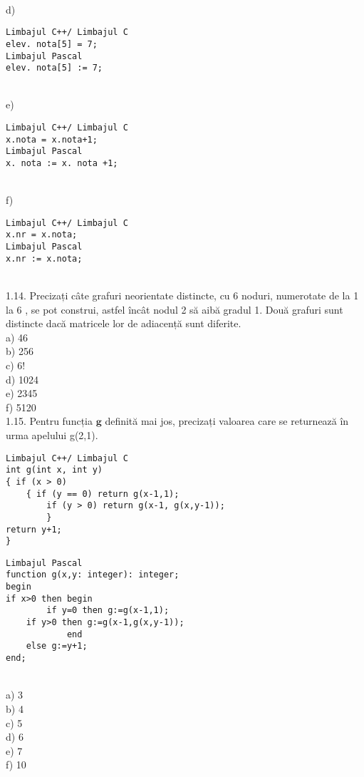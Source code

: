 \\
d) \begin{verbatim}
Limbajul C++/ Limbajul C
elev. nota[5] = 7;
Limbajul Pascal
elev. nota[5] := 7;
\end{verbatim}
\\
e) \begin{verbatim}
Limbajul C++/ Limbajul C
x.nota = x.nota+1;
Limbajul Pascal
x. nota := x. nota +1;
\end{verbatim}
\\
f) \begin{verbatim}
Limbajul C++/ Limbajul C
x.nr = x.nota;
Limbajul Pascal
x.nr := x.nota;
\end{verbatim}
\\
1.14. Precizați câte grafuri neorientate distincte, cu 6 noduri, numerotate de la 1 la 6 , se pot construi, astfel încât nodul 2 să aibă gradul 1. Două grafuri sunt distincte dacă matricele lor de adiacență sunt diferite.
\\
a) 46
\\
b) 256
\\
c) $6!$
\\
d) 1024
\\
e) 2345
\\
f) 5120
\\
1.15. Pentru funcția $\mathbf{g}$ definită mai jos, precizați valoarea care se returnează în urma apelului g(2,1).
\begin{verbatim}
Limbajul C++/ Limbajul C
int g(int x, int y)
{ if (x > 0)
    { if (y == 0) return g(x-1,1);
        if (y > 0) return g(x-1, g(x,y-1));
        }
return y+1;
}
\end{verbatim}
\begin{verbatim}
Limbajul Pascal
function g(x,y: integer): integer;
begin
if x>0 then begin
        if y=0 then g:=g(x-1,1);
    if y>0 then g:=g(x-1,g(x,y-1));
            end
    else g:=y+1;
end;
\end{verbatim}
\\
a) 3
\\
b) 4
\\
c) 5
\\
d) 6
\\
e) 7
\\
f) 10
\\
